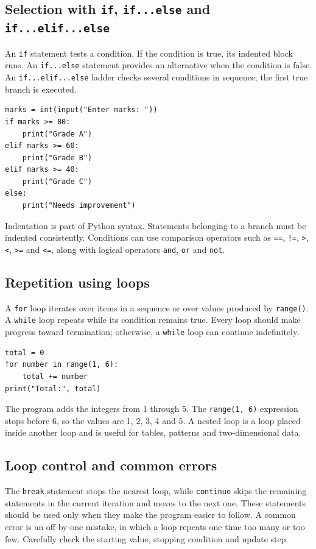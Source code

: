 \documentclass[11pt,openany,oneside]{book}
\begin{document}
\subsection{Selection with \texttt{if}, \texttt{if...else} and \texttt{if...elif...else}}
An \texttt{if} statement tests a condition. If the condition is true, its indented block runs. An \texttt{if...else} statement provides an alternative when the condition is false. An \texttt{if...elif...else} ladder checks several conditions in sequence; the first true branch is executed.

\begin{lstlisting}[style=pythonstyle]
marks = int(input("Enter marks: "))
if marks >= 80:
    print("Grade A")
elif marks >= 60:
    print("Grade B")
elif marks >= 40:
    print("Grade C")
else:
    print("Needs improvement")
\end{lstlisting}
Indentation is part of Python syntax. Statements belonging to a branch must be indented consistently. Conditions can use comparison operators such as \texttt{==}, \texttt{!=}, \texttt{>}, \texttt{<}, \texttt{>=} and \texttt{<=}, along with logical operators \texttt{and}, \texttt{or} and \texttt{not}.

\subsection{Repetition using loops}
A \texttt{for} loop iterates over items in a sequence or over values produced by \texttt{range()}. A \texttt{while} loop repeats while its condition remains true. Every loop should make progress toward termination; otherwise, a \texttt{while} loop can continue indefinitely.

\begin{lstlisting}[style=pythonstyle]
total = 0
for number in range(1, 6):
    total += number
print("Total:", total)
\end{lstlisting}
The program adds the integers from 1 through 5. The \texttt{range(1, 6)} expression stops before 6, so the values are 1, 2, 3, 4 and 5. A nested loop is a loop placed inside another loop and is useful for tables, patterns and two-dimensional data.

\subsection{Loop control and common errors}
The \texttt{break} statement stops the nearest loop, while \texttt{continue} skips the remaining statements in the current iteration and moves to the next one. These statements should be used only when they make the program easier to follow. A common error is an off-by-one mistake, in which a loop repeats one time too many or too few. Carefully check the starting value, stopping condition and update step.
\end{document}
